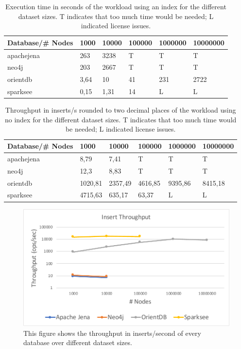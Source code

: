 \begin{table}[h!]
  \begin{minipage}{\textwidth}
    \centering
    \begin{tabularx}{\textwidth}{ | l | X | X | X | X | X | }
      \hline
      Database/\# Nodes & 1000 & 10000 & 100000 & 1000000 & 10000000 \\ \hline
      apachejena & 263 & 3238 & T & T & T \\ \hline
      neo4j & 203 & 2667 & T & T & T \\ \hline
      orientdb & 3,64 & 10 & 41 & 231 & 2722 \\ \hline
      sparksee & 0,15 & 1,31 & 14 & L & L \\ \hline
    \end{tabularx}
  \end{minipage}
  \caption{Execution time in seconds of the workload using an index for the different dataset sizes. T indicates that too much time would be needed; L indicated license issues.}
  \label{tab:withIndexExecutionTime}
\end{table}

\begin{table}[h!]
  \begin{minipage}{\textwidth}
    \centering
    \begin{tabularx}{\textwidth}{ | l | X | X | X | X | X | }
      \hline
      Database/\# Nodes & 1000 & 10000 & 100000 & 1000000 & 10000000 \\ \hline
      apachejena & 8,79 & 7,41 & T & T & T \\ \hline
      neo4j & 12,3 & 8,83 & T & T & T \\ \hline
      orientdb & 1020,81 & 2357,49 & 4616,85 & 9395,86 & 8415,18 \\ \hline
      sparksee & 4715,63 & 635,17 & 63,37 & L & L \\ \hline
    \end{tabularx}
  \end{minipage}
  \caption{Throughput in inserts/s rounded to two decimal places of the workload using no index for the different dataset sizes. T indicates that too much time would be needed; L indicated license issues.}
  \label{tab:withoutIndexThroughput}
\end{table}

\begin{figure}[h!]
  \centering
  \includegraphics[width=.75\textwidth]{images/throughput/withIndexThroughput}
  \caption{This figure shows the throughput in inserts/second of every database over different dataset sizes.}
  \label{fig:withIndexThroughput}
\end{figure}

